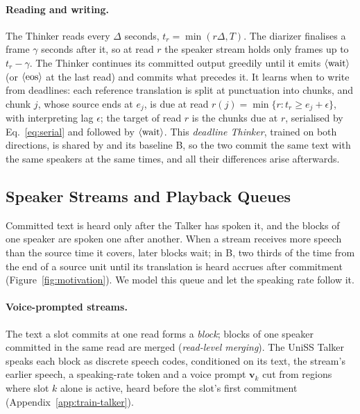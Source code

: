 \paragraph{Reading and writing.} The Thinker reads every $\Delta$ seconds, $t_r=\min(r\Delta,T)$. The diarizer finalises
a frame $\gamma$ seconds after it, so at read $r$ the speaker stream holds only frames up to $t_r-\gamma$. The Thinker
continues its committed output greedily until it emits $\langle\mathrm{wait}\rangle$ (or $\langle\mathrm{eos}\rangle$ at the last read) and commits what precedes
it. It learns when to write from deadlines: each reference translation is split at punctuation into chunks, and chunk
$j$, whose source ends at $e_j$, is due at read $r(j)=\min\{r:t_r\ge e_j+\epsilon\}$, with interpreting lag
$\epsilon$; the target of read $r$ is the chunks due at $r$, serialised by Eq.~\eqref{eq:serial} and followed by
$\langle\mathrm{wait}\rangle$. This \emph{deadline Thinker}, trained on both directions, is shared by \sys{} and its baseline B, so the two
commit the same text with the same speakers at the same times, and all their differences arise afterwards.

\subsection{Speaker Streams and Playback Queues}
\label{sec:method-queue}

Committed text is heard only after the Talker has spoken it, and the blocks of one speaker are spoken one after
another. When a stream receives more speech than the source time it covers, later blocks wait; in B, two thirds of the
time from the end of a source unit until its translation is heard accrues after commitment
(Figure~\ref{fig:motivation}). We model this queue and let the speaking rate follow it.

\paragraph{Voice-prompted streams.} The text a slot commits at one read forms a \emph{block}; blocks of one speaker
committed in the same read are merged (\emph{read-level merging}). The UniSS Talker~\citep{uniss2025} speaks each block
as discrete speech codes, conditioned on its text, the stream's earlier speech, a speaking-rate token and a voice
prompt $\bm{v}_k$ cut from regions where slot $k$ alone is active, heard before the slot's first commitment
(Appendix~\ref{app:train-talker}).

